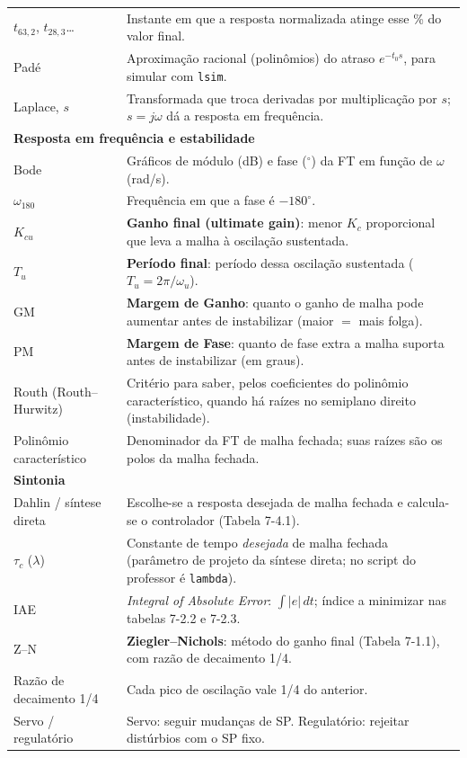 \documentclass[11pt,a4paper]{article}
\begin{document}
\begin{center}
\begin{longtable}{p{2.7cm}p{12.3cm}}
$t_{63,2}$, $t_{28,3}$\ldots & Instante em que a resposta normalizada atinge esse \% do valor final.\\
Padé & Aproximação racional (polinômios) do atraso $e^{-t_0s}$, para simular com \texttt{lsim}.\\
Laplace, $s$ & Transformada que troca derivadas por multiplicação por $s$; $s=j\omega$ dá a resposta em frequência.\\
\multicolumn{2}{l}{\textbf{Resposta em frequência e estabilidade}}\\
Bode & Gráficos de módulo (dB) e fase ($^\circ$) da FT em função de $\omega$ (rad/s).\\
$\omega_{180}$ & Frequência em que a fase é $-180^\circ$.\\
$K_{cu}$ & \textbf{Ganho final (ultimate gain)}: menor $K_c$ proporcional que leva a malha à oscilação sustentada.\\
$T_u$ & \textbf{Período final}: período dessa oscilação sustentada ($T_u=2\pi/\omega_u$).\\
GM & \textbf{Margem de Ganho}: quanto o ganho de malha pode aumentar antes de instabilizar (maior $=$ mais folga).\\
PM & \textbf{Margem de Fase}: quanto de fase extra a malha suporta antes de instabilizar (em graus).\\
Routh (Routh--Hurwitz) & Critério para saber, pelos coeficientes do polinômio característico, quando há raízes no semiplano direito (instabilidade).\\
Polinômio característico & Denominador da FT de malha fechada; suas raízes são os polos da malha fechada.\\
\multicolumn{2}{l}{\textbf{Sintonia}}\\
Dahlin / síntese direta & Escolhe-se a resposta desejada de malha fechada e calcula-se o controlador (Tabela 7-4.1).\\
$\tau_c$ ($\lambda$) & Constante de tempo \emph{desejada} de malha fechada (parâmetro de projeto da síntese direta; no script do professor é \texttt{lambda}).\\
IAE & \emph{Integral of Absolute Error}: $\int|e|\,dt$; índice a minimizar nas tabelas 7-2.2 e 7-2.3.\\
Z--N & \textbf{Ziegler--Nichols}: método do ganho final (Tabela 7-1.1), com razão de decaimento 1/4.\\
Razão de decaimento 1/4 & Cada pico de oscilação vale 1/4 do anterior.\\
Servo / regulatório & Servo: seguir mudanças de SP. Regulatório: rejeitar distúrbios com o SP fixo.\\

\end{longtable}
\end{center}
\end{document}

